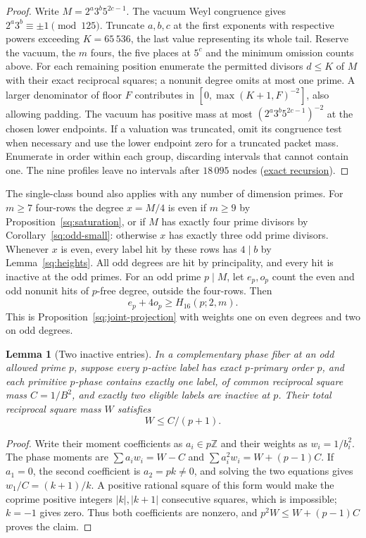 \documentclass[11pt]{amsart}
\numberwithin{equation}{section}
\newtheorem{lemma}[theorem]{Lemma}
\theoremstyle{definition}
\theoremstyle{plain}
\newcommand{\supfile}[2]{\href{run:rank-bound-supplement/#1}{#2}}
\begin{document}
\begin{proof}
Write $M=2^a3^b5^{2c-1}$. The vacuum Weyl congruence gives
$2^a3^b\equiv\pm1\pmod{125}$. Truncate $a,b,c$ at the first
exponents with respective powers exceeding $K=65\,536$, the
last value representing its whole tail. Reserve the vacuum, the
$m$ fours, the five places at $5^c$ and the minimum omission
counts above. For each remaining position enumerate the permitted
divisors $d\le K$ of $M$ with their exact reciprocal squares;
a nonunit degree omits at most one prime. A larger denominator of
floor $F$ contributes in $[0,\max(K+1,F)^{-2}]$, also allowing
padding. The vacuum has positive mass at most $(2^a3^b5^{2c-1})^{-2}$ at the chosen lower endpoints.
If a valuation was truncated, omit its congruence test when necessary
and use the lower endpoint zero for a truncated packet mass.
Enumerate in order within each group, discarding intervals that
cannot contain one. The nine profiles leave no intervals after
$18\,095$ nodes (\supfile{arithmetic/three_prime_cutoff.py}{exact recursion}).
\end{proof}

The single-class bound also applies with any number of dimension primes.
For $m\ge7$ four-rows the degree $x=M/4$ is even if $m\ge9$ by
Proposition~\ref{sq:saturation}, or if $M$ has exactly four prime divisors
by Corollary~\ref{sq:odd-small}: otherwise $x$ has exactly three odd
prime divisors. Whenever $x$ is even, every label hit by these rows has $4\mid b$ by Lemma~\ref{sq:heights}. All odd degrees are hit by principality,
and every hit is inactive at the odd primes. For an odd prime $p\mid M$,
let $e_p,o_p$ count the even and odd nonunit hits of $p$-free degree,
outside the four-rows. Then
\[
                     e_p+4o_p\ge H_{16}(p;2,m).
\]
This is Proposition~\ref{sq:joint-projection} with weights one on even
degrees and two on odd degrees.

\begin{lemma}[Two inactive entries]\label{next:two-inactive}
In a complementary phase fiber at an odd allowed prime $p$, suppose every
$p$-active label has exact $p$-primary order $p$, and each
primitive $p$-phase contains exactly one label, of common reciprocal
square mass $C=1/B^2$, and exactly two eligible labels are inactive at
$p$. Their total reciprocal square mass $W$ satisfies
\[
                         W\le C/(p+1).
\]
\end{lemma}
\begin{proof}
Write their moment coefficients as $a_i\in p\mathbb Z$ and their
weights as $w_i=1/b_i^2$. The phase moments are
$\sum a_iw_i=W-C$ and $\sum a_i^2w_i=W+(p-1)C$.
If $a_1=0$, the second coefficient is $a_2=pk\ne0$, and solving
the two equations gives $w_1/C=(k+1)/k$. A positive rational square
of this form would make the coprime positive integers $|k|,|k+1|$
consecutive squares, which is impossible; $k=-1$ gives zero.
Thus both coefficients are nonzero, and
$p^2W\le W+(p-1)C$ proves the claim.
\end{proof}
\end{document}
